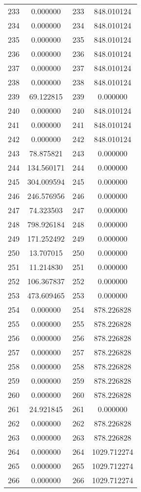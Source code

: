 \documentclass[12pt]{article}
\begin{document}
\begin{longtable}{@{}cccc@{}}
233 & 0.000000 & 233 & 848.010124 \\
234 & 0.000000 & 234 & 848.010124 \\
235 & 0.000000 & 235 & 848.010124 \\
236 & 0.000000 & 236 & 848.010124 \\
237 & 0.000000 & 237 & 848.010124 \\
238 & 0.000000 & 238 & 848.010124 \\
239 & 69.122815 & 239 & 0.000000 \\
240 & 0.000000 & 240 & 848.010124 \\
241 & 0.000000 & 241 & 848.010124 \\
242 & 0.000000 & 242 & 848.010124 \\
243 & 78.875821 & 243 & 0.000000 \\
244 & 134.560171 & 244 & 0.000000 \\
245 & 304.009594 & 245 & 0.000000 \\
246 & 246.576956 & 246 & 0.000000 \\
247 & 74.323503 & 247 & 0.000000 \\
248 & 798.926184 & 248 & 0.000000 \\
249 & 171.252492 & 249 & 0.000000 \\
250 & 13.707015 & 250 & 0.000000 \\
251 & 11.214830 & 251 & 0.000000 \\
252 & 106.367837 & 252 & 0.000000 \\
253 & 473.609465 & 253 & 0.000000 \\
254 & 0.000000 & 254 & 878.226828 \\
255 & 0.000000 & 255 & 878.226828 \\
256 & 0.000000 & 256 & 878.226828 \\
257 & 0.000000 & 257 & 878.226828 \\
258 & 0.000000 & 258 & 878.226828 \\
259 & 0.000000 & 259 & 878.226828 \\
260 & 0.000000 & 260 & 878.226828 \\
261 & 24.921845 & 261 & 0.000000 \\
262 & 0.000000 & 262 & 878.226828 \\
263 & 0.000000 & 263 & 878.226828 \\
264 & 0.000000 & 264 & 1029.712274 \\
265 & 0.000000 & 265 & 1029.712274 \\
266 & 0.000000 & 266 & 1029.712274 \\

\end{longtable}
\end{document}
